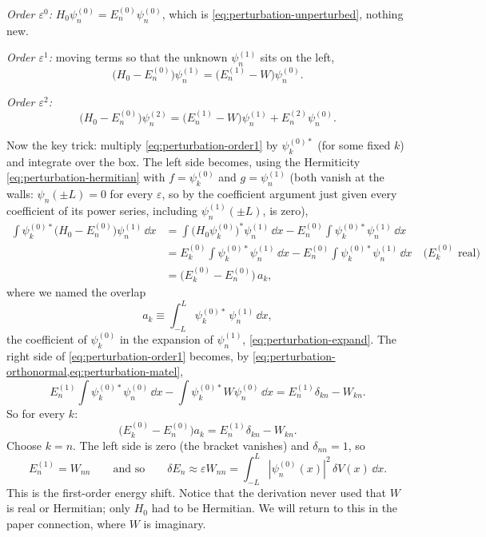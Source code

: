 \emph{Order $\varepsilon^0$:} $H_0\psi_n^{(0)}=E_n^{(0)}\psi_n^{(0)}$, which is \cref{eq:perturbation-unperturbed}, nothing new.

\emph{Order $\varepsilon^1$:} moving terms so that the unknown $\psi_n^{(1)}$ sits on the left,
\begin{equation}
\bigl(H_0-E_n^{(0)}\bigr)\psi_n^{(1)}=\bigl(E_n^{(1)}-W\bigr)\psi_n^{(0)} .
\label{eq:perturbation-order1}
\end{equation}

\emph{Order $\varepsilon^2$:}
\begin{equation}
\bigl(H_0-E_n^{(0)}\bigr)\psi_n^{(2)}=\bigl(E_n^{(1)}-W\bigr)\psi_n^{(1)}+E_n^{(2)}\psi_n^{(0)} .
\label{eq:perturbation-order2}
\end{equation}

Now the key trick: multiply \cref{eq:perturbation-order1} by $\psi_k^{(0)*}$ (for some fixed $k$) and integrate over the box. The left side becomes, using the Hermiticity \cref{eq:perturbation-hermitian} with $f=\psi_k^{(0)}$ and $g=\psi_n^{(1)}$ (both vanish at the walls: $\psi_n(\pm L)=0$ for every $\varepsilon$, so by the coefficient argument just given every coefficient of its power series, including $\psi_n^{(1)}(\pm L)$, is zero),
\begin{align*}
\int\psi_k^{(0)*}\bigl(H_0-E_n^{(0)}\bigr)\psi_n^{(1)}\,\dd x
&=\int\bigl(H_0\psi_k^{(0)}\bigr)^*\psi_n^{(1)}\,\dd x-E_n^{(0)}\int\psi_k^{(0)*}\psi_n^{(1)}\,\dd x\\
&=E_k^{(0)}\int\psi_k^{(0)*}\psi_n^{(1)}\,\dd x-E_n^{(0)}\int\psi_k^{(0)*}\psi_n^{(1)}\,\dd x
\quad\text{($E_k^{(0)}$ real)}\\
&=\bigl(E_k^{(0)}-E_n^{(0)}\bigr)\,a_k,
\end{align*}
where we named the overlap
\begin{equation}
a_k\equiv\int_{-L}^{L}\psi_k^{(0)*}\,\psi_n^{(1)}\,\dd x ,
\label{eq:perturbation-ak}
\end{equation}
the coefficient of $\psi_k^{(0)}$ in the expansion of $\psi_n^{(1)}$, \cref{eq:perturbation-expand}. The right side of \cref{eq:perturbation-order1} becomes, by \cref{eq:perturbation-orthonormal,eq:perturbation-matel},
\[
E_n^{(1)}\int\psi_k^{(0)*}\psi_n^{(0)}\,\dd x-\int\psi_k^{(0)*}W\psi_n^{(0)}\,\dd x=E_n^{(1)}\delta_{kn}-W_{kn}.
\]
So for every $k$:
\begin{equation}
\bigl(E_k^{(0)}-E_n^{(0)}\bigr)a_k=E_n^{(1)}\delta_{kn}-W_{kn}.
\label{eq:perturbation-projected1}
\end{equation}
Choose $k=n$. The left side is zero (the bracket vanishes) and $\delta_{nn}=1$, so
\begin{equation}
\boxed{E_n^{(1)}=W_{nn}}\qquad\text{and so}\qquad
\delta E_n\approx\varepsilon W_{nn}=\int_{-L}^{L}|\psi_n^{(0)}(x)|^2\,\delta V(x)\,\dd x .
\label{eq:perturbation-first}
\end{equation}
This is the first-order energy shift. Notice that the derivation never used that $W$ is real or Hermitian; only $H_0$ had to be Hermitian. We will return to this in the paper connection, where $W$ is imaginary.

